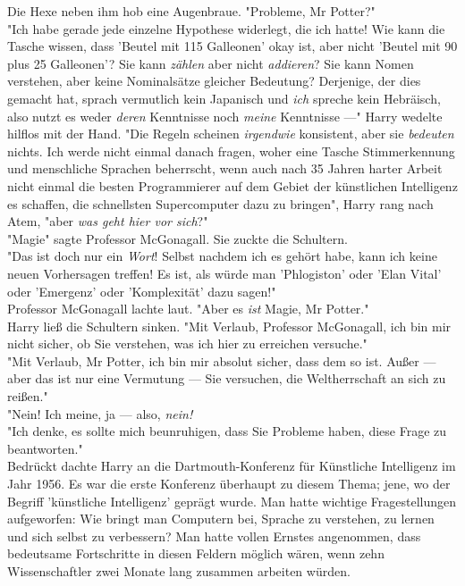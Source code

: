 {Die Hexe neben ihm hob eine Augenbraue. "Probleme, Mr Potter?"\\ "Ich habe gerade jede einzelne Hypothese widerlegt, die ich hatte! Wie kann die Tasche wissen, dass 'Beutel mit 115 Galleonen' okay ist, aber nicht 'Beutel mit 90 plus 25 Galleonen'? Sie kann \emph{zählen} aber nicht \emph{addieren}? Sie kann Nomen verstehen, aber keine Nominalsätze gleicher Bedeutung? Derjenige, der dies gemacht hat, sprach vermutlich kein Japanisch und \emph{ich} spreche kein Hebräisch, also nutzt es weder \emph{deren} Kenntnisse noch \emph{meine} Kenntnisse ---" Harry wedelte hilflos mit der Hand. "Die Regeln scheinen \emph{irgendwie} konsistent, aber sie \emph{bedeuten} nichts. Ich werde nicht einmal danach fragen, woher eine Tasche Stimmerkennung und menschliche Sprachen beherrscht, wenn auch nach 35 Jahren harter Arbeit nicht einmal die besten Programmierer auf dem Gebiet der künstlichen Intelligenz es schaffen, die schnellsten Supercomputer dazu zu bringen", Harry rang nach Atem, "aber \emph{was geht hier vor sich}?"\\ "Magie" sagte Professor McGonagall. Sie zuckte die Schultern.\\ "Das ist doch nur ein \emph{Wort}! Selbst nachdem ich es gehört habe, kann ich keine neuen Vorhersagen treffen! Es ist, als würde man 'Phlogiston' oder 'Elan Vital' oder 'Emergenz' oder 'Komplexität' dazu sagen!"\\ Professor McGonagall lachte laut. "Aber es \emph{ist} Magie, Mr Potter."\\ Harry ließ die Schultern sinken. "Mit Verlaub, Professor McGonagall, ich bin mir nicht sicher, ob Sie verstehen, was ich hier zu erreichen versuche."\\ "Mit Verlaub, Mr Potter, ich bin mir absolut sicher, dass dem so ist. Außer --- aber das ist nur eine Vermutung --- Sie versuchen, die Weltherrschaft an sich zu reißen."\\ "Nein! Ich meine, ja --- also, \emph{nein!}\\ "Ich denke, es sollte mich beunruhigen, dass Sie Probleme haben, diese Frage zu beantworten."\\ Bedrückt dachte Harry an die Dartmouth-Konferenz für Künstliche Intelligenz im Jahr 1956. Es war die erste Konferenz überhaupt zu diesem Thema; jene, wo der Begriff 'künstliche Intelligenz' geprägt wurde. Man hatte wichtige Fragestellungen aufgeworfen: Wie bringt man Computern bei, Sprache zu verstehen, zu lernen und sich selbst zu verbessern? Man hatte vollen Ernstes angenommen, dass bedeutsame Fortschritte in diesen Feldern möglich wären, wenn zehn Wissenschaftler zwei Monate lang zusammen arbeiten würden.

}
